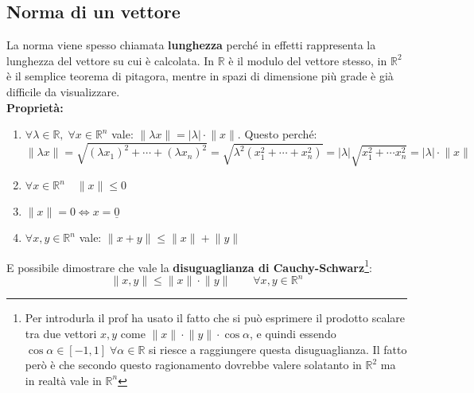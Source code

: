 \subsection{Norma di un vettore} \label{sec_norma}
La norma viene spesso chiamata \textbf{lunghezza} perché in effetti rappresenta la lunghezza del vettore su cui è calcolata. In $\mathbb{R}$ è il modulo del vettore stesso, in $\mathbb{R}^2$ è il semplice teorema di pitagora, mentre in spazi di dimensione più grade è già difficile da visualizzare.\\

\textbf{Proprietà:} 
\begin{enumerate}
	\item $\forall \lambda \in \mathbb{R}, \;\forall x \in \mathbb{R}^n$ vale: $\lVert \lambda x \rVert = |\lambda| \cdot \lVert x \rVert$. Questo perché:
		\begin{equation*}
			\lVert \lambda x \rVert = \sqrt{(\lambda x_1)^2 + \cdots + (\lambda x_n)^2} = \sqrt{\lambda^2 (x_1^2 + \cdots + x_n^2)} = |\lambda| \sqrt{x_1^2 + \cdots x_n^2} = |\lambda| \cdot \lVert x \rVert
		\end{equation*}
	
	\item $\forall x \in \mathbb{R}^n \quad \lVert x \rVert \leq 0$
	
	\item $\lVert x \rVert = 0 \iff x = \underline{0}$

	\item $\forall x, y \in \mathbb{R}^n$ vale: $\lVert x + y \rVert \leq \lVert x \rVert + \lVert y \rVert$
\end{enumerate}

E possibile dimostrare che vale la \textbf{disuguaglianza di Cauchy-Schwarz}\footnote{Per introdurla il prof ha usato il fatto che si può esprimere il prodotto scalare tra due vettori $x, y$ come $\lVert x \rVert \cdot \lVert y \rVert \cdot \cos{\alpha}$, e quindi essendo $\cos{\alpha} \in [-1, 1] \; \forall \alpha \in \mathbb{R}$ si riesce a raggiungere questa disuguaglianza. Il fatto però è che secondo questo ragionamento dovrebbe valere solatanto in $\mathbb{R}^2$ ma in realtà vale in $\mathbb{R}^n$}:
\begin{equation*}
	\lVert x, y \rVert \leq \lVert x \rVert \cdot \lVert y \rVert \qquad \forall x, y \in \mathbb{R}^n
\end{equation*}


